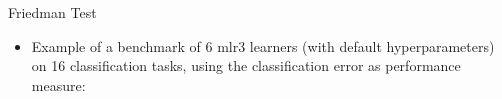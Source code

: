 \documentclass[11pt,compress,t,notes=noshow, xcolor=table]{beamer}
\begin{document}
\begin{frame}{Friedman Test}

\begin{itemize}
\item Example of a benchmark of 6 mlr3 learners (with default hyperparameters) on 16 classification tasks, using the classification error as performance measure:

\end{itemize}


\end{frame}
\end{document}

